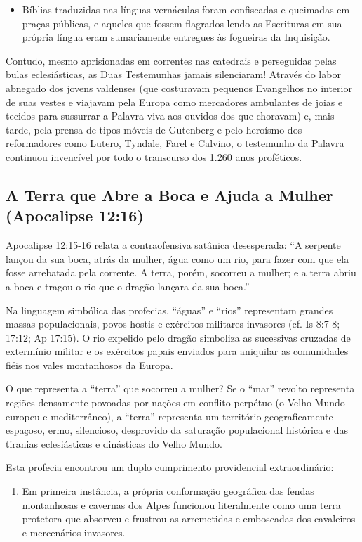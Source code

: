 \begin{itemize}
  \item Bíblias traduzidas nas línguas vernáculas foram confiscadas e queimadas em praças públicas, e aqueles que fossem flagrados lendo as Escrituras em sua própria língua eram sumariamente entregues às fogueiras da Inquisição.
\end{itemize}


Contudo, mesmo aprisionadas em correntes nas catedrais e perseguidas pelas bulas eclesiásticas, as Duas Testemunhas jamais silenciaram! Através do labor abnegado dos jovens valdenses (que costuravam pequenos Evangelhos no interior de suas vestes e viajavam pela Europa como mercadores ambulantes de joias e tecidos para sussurrar a Palavra viva aos ouvidos dos que choravam) e, mais tarde, pela prensa de tipos móveis de Gutenberg e pelo heroísmo dos reformadores como Lutero, Tyndale, Farel e Calvino, o testemunho da Palavra continuou invencível por todo o transcurso dos 1.260 anos proféticos.



\subsection{A Terra que Abre a Boca e Ajuda a Mulher (Apocalipse 12:16)}


Apocalipse 12:15-16 relata a contraofensiva satânica desesperada: ``A serpente lançou da sua boca, atrás da mulher, água como um rio, para fazer com que ela fosse arrebatada pela corrente. A terra, porém, socorreu a mulher; e a terra abriu a boca e tragou o rio que o dragão lançara da sua boca.''

Na linguagem simbólica das profecias, ``águas'' e ``rios'' representam grandes massas populacionais, povos hostis e exércitos militares invasores (cf. Is 8:7-8; 17:12; Ap 17:15). O rio expelido pelo dragão simboliza as sucessivas cruzadas de extermínio militar e os exércitos papais enviados para aniquilar as comunidades fiéis nos vales montanhosos da Europa.

O que representa a ``terra'' que socorreu a mulher?
Se o ``mar'' revolto representa regiões densamente povoadas por nações em conflito perpétuo (o Velho Mundo europeu e mediterrâneo), a ``terra'' representa um território geograficamente espaçoso, ermo, silencioso, desprovido da saturação populacional histórica e das tiranias eclesiásticas e dinásticas do Velho Mundo.

Esta profecia encontrou um duplo cumprimento providencial extraordinário:
\begin{enumerate}
  \item Em primeira instância, a própria conformação geográfica das fendas montanhosas e cavernas dos Alpes funcionou literalmente como uma terra protetora que absorveu e frustrou as arremetidas e emboscadas dos cavaleiros e mercenários invasores.
\end{enumerate}

